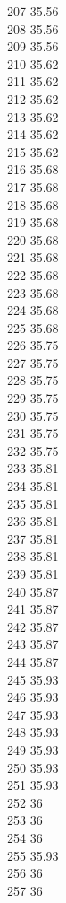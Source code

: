 207	35.56\\
208	35.56\\
209	35.56\\
210	35.62\\
211	35.62\\
212	35.62\\
213	35.62\\
214	35.62\\
215	35.62\\
216	35.68\\
217	35.68\\
218	35.68\\
219	35.68\\
220	35.68\\
221	35.68\\
222	35.68\\
223	35.68\\
224	35.68\\
225	35.68\\
226	35.75\\
227	35.75\\
228	35.75\\
229	35.75\\
230	35.75\\
231	35.75\\
232	35.75\\
233	35.81\\
234	35.81\\
235	35.81\\
236	35.81\\
237	35.81\\
238	35.81\\
239	35.81\\
240	35.87\\
241	35.87\\
242	35.87\\
243	35.87\\
244	35.87\\
245	35.93\\
246	35.93\\
247	35.93\\
248	35.93\\
249	35.93\\
250	35.93\\
251	35.93\\
252	36\\
253	36\\
254	36\\
255	35.93\\
256	36\\
257	36\\
